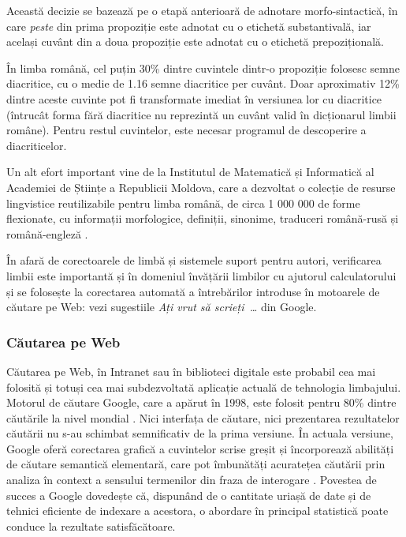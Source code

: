 \begin{multicols}{2}
Această decizie se bazează pe o etapă anterioară de adnotare morfo-sintactică, în care \textit{peste} din prima propoziție este adnotat cu o etichetă substantivală, iar același cuvânt din a doua propoziție este adnotat cu o etichetă prepozițională.

În limba română, cel puțin 30\% dintre cuvintele dintr-o propoziție folosesc semne diacritice, cu o medie de 1.16 semne diacritice per cuvânt. Doar aproximativ 12\% dintre aceste cuvinte pot fi transformate imediat în versiunea lor cu diacritice (întrucât forma fără diacritice nu reprezintă un cuvânt valid în dicționarul limbii române). Pentru restul cuvintelor, este necesar programul de descoperire a diacriticelor.

Un alt efort important vine de la Institutul de Matematică și Informatică al Academiei de Științe a Republicii Moldova, care a dezvoltat o colecție de resurse lingvistice reutilizabile pentru limba română, de circa 1 000 000 de forme flexionate, cu informații morfologice, definiții, sinonime, traduceri română-rusă și română-engleză \cite{elrr}.

În afară de corectoarele de limbă și sistemele suport pentru autori, verificarea limbii este importantă și în domeniul învățării limbilor cu ajutorul calculatorului și se folosește la corectarea automată a întrebărilor introduse în motoarele de căutare pe Web: vezi sugestiile \textit{Ați vrut să scrieți~\dots} din Google.

\subsubsection{Căutarea pe Web}

Căutarea pe Web, în Intranet sau în biblioteci digitale este probabil cea mai folosită și totuși cea mai subdezvoltată aplicație actuală de tehnologia limbajului. Motorul de căutare Google, care a apărut în 1998, este folosit pentru 80\% dintre căutările la nivel mondial \cite{spi1}. Nici interfața de căutare, nici prezentarea rezultatelor căutării nu s-au schimbat semnificativ de la prima versiune. În actuala versiune, Google oferă corectarea grafică a cuvintelor scrise greșit și încorporează abilități de căutare semantică elementară, care pot îmbunătăți acuratețea căutării prin analiza în context a sensului termenilor din fraza de interogare \cite{pc1}. Povestea de succes a Google dovedește că, dispunând de o cantitate uriașă de date și de tehnici eficiente de indexare a acestora, o abordare în principal statistică poate conduce la rezultate satisfăcătoare.


\end{multicols}
